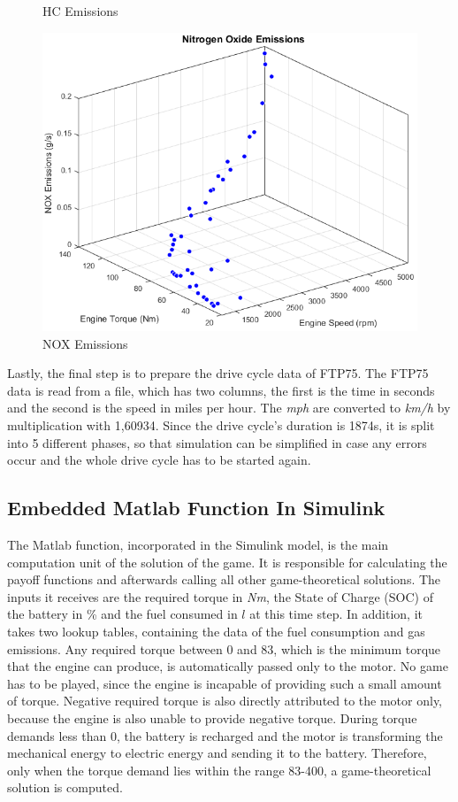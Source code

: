 \begin{figure}[!htb]
   \captionsetup{labelsep=space,justification=justified,singlelinecheck=off}
  \caption{HC Emissions}\label{fig:hcFit}
\endminipage\hfill
{}%
  \includegraphics[scale=0.29]{figures/NOX}
   \captionsetup{labelsep=space,justification=justified,singlelinecheck=off}
  \caption{NOX Emissions}\label{fig:noxFit}
\endminipage
\end{figure}

Lastly, the final step is to prepare the drive cycle data of FTP75. The FTP75 data is read from a file, which has two columns, the first is the time in seconds and the second is the speed in miles per hour. The \textit{mph} are converted to \textit{km/h} by multiplication with 1,60934. Since the drive cycle's duration is 1874s, it is split into 5 different phases, so that simulation can be simplified in case any errors occur and the whole drive cycle has to be started again. 

\subsection{Embedded Matlab Function In Simulink}
\label{subsec:embeddedfunc}
The Matlab function, incorporated in the Simulink model, is the main computation unit of the solution of the game. It is responsible for calculating the payoff functions and afterwards calling all other game-theoretical solutions. The inputs it receives are the required torque in \textit{Nm}, the State of Charge (SOC) of the battery in \% and the fuel consumed in $l$ at this time step. In addition, it takes two lookup tables, containing the data of the fuel consumption and gas emissions. Any required torque between 0 and 83, which is the minimum torque that the engine can produce, is automatically passed only to the motor. No game has to be played, since the engine is incapable of providing such a small amount of torque. Negative required torque is also directly attributed to the motor only, because the engine is also unable to provide negative torque. During torque demands less than 0, the battery is recharged and the motor is transforming the mechanical energy to electric energy and sending it to the battery. Therefore, only when the torque demand lies within the range 83-400, a game-theoretical solution is computed.

